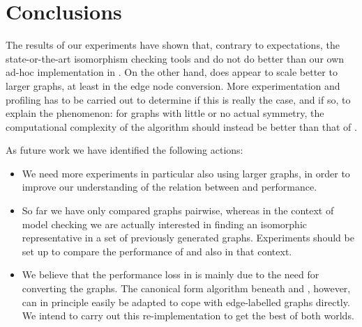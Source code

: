 \section{Conclusions}
\label{section-conclusions}

The results of our experiments have shown that, contrary to expectations, the
state-or-the-art isomorphism checking tools \NAUTY and \BLISS do not do better
than our own ad-hoc implementation in \GROOVE. On the other hand, \BLISS does
appear to scale better to larger graphs, at least in the edge node conversion.
More experimentation and profiling has to be carried out to determine if this
is really the case, and if so, to explain the phenomenon: for graphs with
little or no actual symmetry, the computational complexity of the \GROOVE
algorithm should instead be better than that of \BLISS.

As future work we have identified the following actions:
\begin{itemize}\itemsep0pt
\item We need more experiments in particular also using larger graphs, in order
  to improve our understanding of the relation between \GROOVE and \BLISS performance.

\item So far we have only compared graphs pairwise, whereas in the
  context of model checking we are actually interested in finding an isomorphic
  representative in a set of previously generated graphs. Experiments should be
  set up to compare the performance of \GROOVE and \BLISS also in that context.

\item We believe that the performance loss in \BLISS is mainly due to the need
  for converting the graphs. The canonical form algorithm beneath \NAUTY and
  \BLISS, however, can in principle easily be adapted to cope with
  edge-labelled graphs directly. We intend to carry out this re-implementation
  to get the best of both worlds.
\end{itemize}

